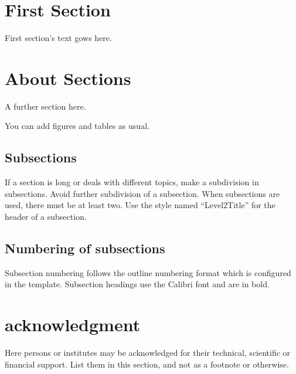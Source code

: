 \documentclass{imeko_acta}
\begin{document}
\section{First Section}

First section's text gows here.

\section{About Sections}

A further section here.

You can add figures and tables as usual.


	

\subsection{Subsections} \label{sec:sub1}

If a section is long or deals with different topics, make a subdivision in subsections. Avoid further subdivision of a subsection. When subsections are used, there must be at least two. Use the style named ``Level2Title'' for the header of a subsection.

\subsection{Numbering of subsections}

Subsection numbering follows the outline numbering format which is configured in the template. Subsection headings use the Calibri font and are in bold.

\section*{acknowledgment} 

Here persons or institutes may be acknowledged for their technical, scientific or financial support. List them in this section, and not as a footnote or otherwise.

\nocite{*}


\end{document}
